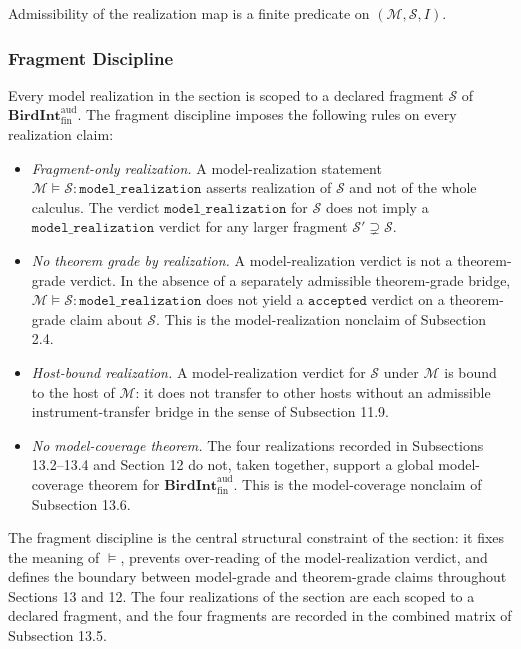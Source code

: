 \documentclass[11pt]{article}
\providecommand{\tightlist}{}
\theoremstyle{definition}
\begin{document}
Admissibility of the realization map is a finite predicate on \((\mathcal M,\mathcal S,I)\).

\subsubsection{Fragment Discipline}

Every model realization in the section is scoped to a declared fragment \(\mathcal S\) of \(\mathbf{BirdInt}^{\mathrm{aud}}_{\mathrm{fin}}\). The fragment discipline imposes the following rules on every realization claim:

\begin{itemize}
\tightlist
\item
  \emph{Fragment-only realization.} A model-realization statement \(\mathcal M\models\mathcal S:\texttt{model\_realization}\) asserts realization of \(\mathcal S\) and not of the whole calculus. The verdict \(\texttt{model\_realization}\) for \(\mathcal S\) does not imply a \(\texttt{model\_realization}\) verdict for any larger fragment \(\mathcal S'\supsetneq\mathcal S\).
\item
  \emph{No theorem grade by realization.} A model-realization verdict is not a theorem-grade verdict. In the absence of a separately admissible theorem-grade bridge, \(\mathcal M\models\mathcal S:\texttt{model\_realization}\) does not yield a \(\texttt{accepted}\) verdict on a theorem-grade claim about \(\mathcal S\). This is the model-realization nonclaim of Subsection 2.4.
\item
  \emph{Host-bound realization.} A model-realization verdict for \(\mathcal S\) under \(\mathcal M\) is bound to the host of \(\mathcal M\): it does not transfer to other hosts without an admissible instrument-transfer bridge in the sense of Subsection 11.9.
\item
  \emph{No model-coverage theorem.} The four realizations recorded in Subsections 13.2--13.4 and Section 12 do not, taken together, support a global model-coverage theorem for \(\mathbf{BirdInt}^{\mathrm{aud}}_{\mathrm{fin}}\). This is the model-coverage nonclaim of Subsection 13.6.
\end{itemize}

The fragment discipline is the central structural constraint of the section: it fixes the meaning of \(\models\), prevents over-reading of the model-realization verdict, and defines the boundary between model-grade and theorem-grade claims throughout Sections 13 and 12. The four realizations of the section are each scoped to a declared fragment, and the four fragments are recorded in the combined matrix of Subsection 13.5.
\end{document}
